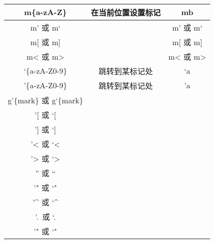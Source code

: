 \documentclass{article}
\begin{document}
\begin{center}
  \tt
  \begin{supertabular}{|c|c|c|}
    m\{a-zA-Z\}      & 在当前位置设置标记    &   mb  \\\hline
    m' 或 m`         &                       &  m' 或 m` \\\hline
    m[ 或 m]         &                       &  m[ 或 m] \\\hline
    m< 或 m>         &                       &  m< 或 m> \\\hline
    `\{a-zA-Z0-9\}   & 跳转到某标记处        &   `a  \\\hline
    '\{a-zA-Z0-9\}   & 跳转到某标记处        &   'a  \\\hline
    g'\{mark\} 或 g`\{mark\} &&\\\hline
    '[ 或 `[            &     &\\\hline
    '] 或 `]            &&\\\hline
    '< 或 `<            &&\\\hline
    '> 或 `>            &&\\\hline
    '' 或 ``            &&\\\hline
    '" 或 `"            &&\\                       \hline
    '\^{}  或 `\^{}     &&\\                       \hline
    '.\ 或 `.           &&\\                       \hline
    '" 或 `"            &&\\                       \hline
  \end{supertabular}
\end{center}
\end{document}
